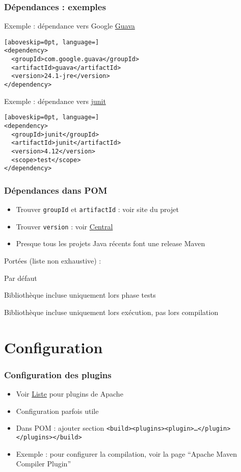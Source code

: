 \documentclass[english, french]{beamer}
\begin{document}
\begin{frame}[fragile]
	\frametitle{Dépendances : exemples}
	\begin{block}{Exemple : dépendance vers Google \href{https://github.com/google/guava/blob/master/README.md}{Guava}}
		\begin{lstlisting}[aboveskip=0pt, language=]
<dependency>
  <groupId>com.google.guava</groupId>
  <artifactId>guava</artifactId>
  <version>24.1-jre</version>
</dependency>
\end{lstlisting}\vspace{-1mm}
	\end{block}
	\begin{block}{Exemple : dépendance vers \href{http://search.maven.org/\#search\%7Cgav\%7C1\%7Cg:"junit" AND a:"junit"}{junit}}
		\begin{lstlisting}[aboveskip=0pt, language=]
<dependency>
  <groupId>junit</groupId>
  <artifactId>junit</artifactId>
  <version>4.12</version>
  <scope>test</scope>
</dependency>
\end{lstlisting}	\vspace{-1mm}
	\end{block}
\end{frame}

\begin{frame}
	\frametitle{Dépendances dans POM}
	\begin{itemize}
		\item Trouver \texttt{groupId} et \texttt{artifactId} : voir site du projet
		\item Trouver \texttt{version} : voir \href{https://search.maven.org}{Central}
		\item Presque tous les projets Java récents font une release Maven
	\end{itemize}
	Portées {\tiny (liste non exhaustive)} :
	\begin{description}
		\item[\texttt{compile}] Par défaut
		\item[\texttt{test}] Bibliothèque incluse uniquement lors phase tests
		\item[\texttt{runtime}] Bibliothèque incluse uniquement lors exécution, pas lors compilation
	\end{description}
\end{frame}

\section{Configuration}
\begin{frame}
	\frametitle{Configuration des plugins}
	\begin{itemize}
		\item Voir \href{https://maven.apache.org/plugins/index.html}{Liste} pour plugins de Apache
		\item Configuration parfois utile
		\item Dans POM : ajouter section \texttt{<build><plugins><plugin>…</plugin></plugins></build>}
		\item Exemple : pour configurer la compilation, voir la page “Apache Maven Compiler Plugin”
	\end{itemize}
\end{frame}
\end{document}
